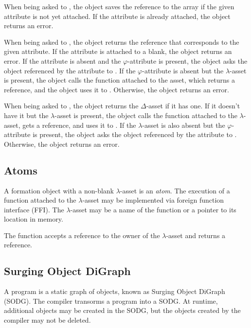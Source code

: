 When being asked to , the object saves the reference to the array if the given attribute is not yet attached.
If the attribute is already attached, the object returns an error.

When being asked to , the object returns the reference that corresponds to the given attribute.
If the attribute is attached to a blank, the object returns an error.
If the attribute is absent and the \(\varphi\)-attribute is present, the object asks the object referenced by the attribute to .
If the \(\varphi\)-attribute is absent but the \(\lambda\)-asset is present, the object calls the function attached to the asset, which returns a reference, and the object uses it to .
Otherwise, the object returns an error.

When being asked to , the object returns the \(\Delta\)-asset if it has one.
If it doesn't have it but the \(\lambda\)-asset is present, the object calls the function attached to the \(\lambda\)-asset, gets a reference, and uses it to .
If the \(\lambda\)-asset is also absent but the \(\varphi\)-attribute is present, the object asks the object referenced by the attribute to .
Otherwise, the object returns an error.

\subsection{Atoms}

A formation object with a non-blank \(\lambda\)-asset is an \emph{atom}.
The execution of a function attached to the \(\lambda\)-asset may be implemented via foreign function interface (FFI).
The \(\lambda\)-asset may be a name of the function or a pointer to its location in memory.

The function accepts a reference to the owner of the \(\lambda\)-asset and returns a reference.

\subsection{Surging Object DiGraph}

A program is a static graph of objects, known as Surging Object DiGraph (SODG).
The compiler transorms a program into a SODG.
At runtime, additional objects may be created in the SODG, but the objects created by the compiler may not be deleted.

